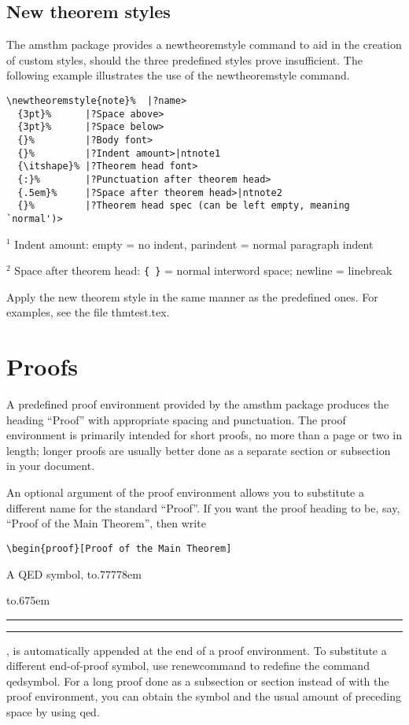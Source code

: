 \documentclass[twoside]{article}
\providecommand{\qq}[1]{\textquotedblleft#1\textquotedblright}
\newcommand{\ntt}{%
  \fontfamily\ttdefault \fontseries\mddefault \fontshape\updefault
  \selectfont
}
\DeclareRobustCommand{\cn}[1]{{\ntt\bslchar#1}}
\DeclareRobustCommand{\pkg}[1]{{\ntt#1}}
\DeclareRobustCommand{\env}[1]{{\ntt#1}}
\DeclareRobustCommand{\fn}[1]{{\ntt#1}}
\providecommand{\qedsymbol}{\leavevmode
  \hbox to.77778em{%
  \hfil\vrule
  \vbox to.675em{\hrule width.6em\vfil\hrule}%
  \vrule\hfil}}
\def\ntnote#1{{\normalfont$^{#1}$}}
\begin{document}
\subsection{New theorem styles}

The \pkg{amsthm} package provides a \cn{newtheoremstyle} command
to aid in the creation of custom styles, should the three predefined
styles prove insufficient.  The following example illustrates the use
of the \cn{newtheoremstyle} command.
\begin{verbatim}
\newtheoremstyle{note}%  |?name>
  {3pt}%      |?Space above>
  {3pt}%      |?Space below>
  {}%         |?Body font>
  {}%         |?Indent amount>|ntnote1
  {\itshape}% |?Theorem head font>
  {:}%        |?Punctuation after theorem head>
  {.5em}%     |?Space after theorem head>|ntnote2
  {}%         |?Theorem head spec (can be left empty, meaning `normal')>
\end{verbatim}
\noindent
\ntnote1 Indent amount: empty = no indent, \cn{parindent} = normal
 paragraph indent

\noindent
\ntnote2 Space after theorem head: \verb+{ }+ = normal interword space;
 \cn{newline} = linebreak

\smallskip
Apply the new theorem style in the same manner as the predefined ones.
For examples, see the file \fn{thmtest.tex}.


\section{Proofs}

A predefined \env{proof} environment provided by the \pkg{amsthm}
package produces the heading \qq{Proof} with appropriate spacing and
punctuation. The proof environment is primarily intended for short
proofs, no more than a page or two in length; longer proofs are
usually better done as a separate \cn{section} or \cn{subsection} in
your document.

An optional argument of the proof environment allows you to substitute
a different name for the standard \qq{Proof\/}. If you want
the proof heading to be, say, \qq{Proof of the Main Theorem}, then write
\begin{verbatim}
\begin{proof}[Proof of the Main Theorem]
\end{verbatim}

A QED symbol, \qedsymbol, is automatically appended at the end of
a \env{proof} environment. To substitute a different end-of-proof
symbol, use \cn{renewcommand} to redefine the command \cn{qedsymbol}.
For a long proof done as a subsection or section instead of with the
\env{proof} environment, you can obtain the symbol and the usual
amount of preceding space by using \cn{qed}.
\end{document}
